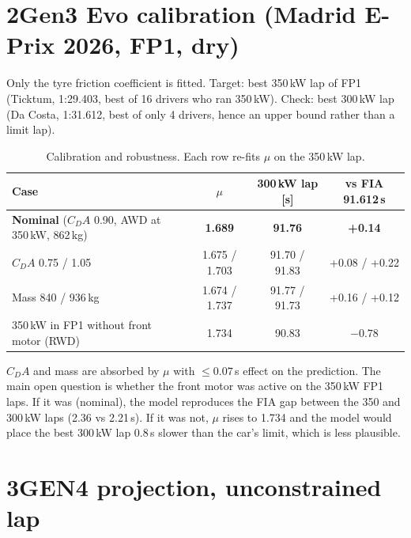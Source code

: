 \documentclass[10pt,a4paper]{article}
\begin{document}
\section*{2\quad Gen3 Evo calibration (Madrid E-Prix 2026, FP1, dry)}

Only the tyre friction coefficient is fitted. Target: best 350\,kW lap of FP1 (Ticktum,
1:29.403, best of 16 drivers who ran 350\,kW). Check: best 300\,kW lap (Da Costa, 1:31.612,
best of only 4 drivers, hence an upper bound rather than a limit lap).

\begin{table}[H]
\centering\small
\caption{Calibration and robustness. Each row re-fits $\mu$ on the 350\,kW lap.}
\begin{tabular}{@{}lccc@{}}
\toprule
Case & $\mu$ & 300\,kW lap [s] & vs FIA 91.612\,s \\
\midrule
\textbf{Nominal} ($C_DA$ 0.90, AWD at 350\,kW, 862\,kg) & \textbf{1.689} & \textbf{91.76} & \textbf{+0.14} \\
$C_DA$ 0.75 / 1.05                                     & 1.675 / 1.703 & 91.70 / 91.83 & +0.08 / +0.22 \\
Mass 840 / 936\,kg                                     & 1.674 / 1.737 & 91.77 / 91.73 & +0.16 / +0.12 \\
350\,kW in FP1 without front motor (RWD)               & 1.734         & 90.83         & $-0.78$ \\
\bottomrule
\end{tabular}
\end{table}

$C_DA$ and mass are absorbed by $\mu$ with $\le 0.07$\,s effect on the prediction. The main open question is whether the front motor was active on the 350\,kW FP1 laps.
If it was (nominal), the model reproduces the FIA gap between the 350 and 300\,kW laps
(2.36 vs 2.21\,s). If it was not, $\mu$ rises to 1.734 and the model would place the
best 300\,kW lap 0.8\,s slower than the car's limit, which is less plausible.

\section*{3\quad GEN4 projection, unconstrained lap}
\end{document}
